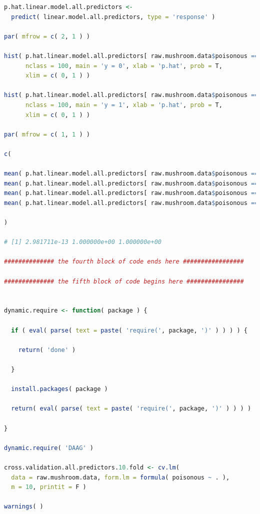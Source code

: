 \documentclass[12pt]{article}
\begin{document}
\begin{lstlisting}[language = R]
p.hat.linear.model.all.predictors <- 
  predict( linear.model.all.predictors, type = 'response' )

par( mfrow = c( 2, 1 ) )

hist( p.hat.linear.model.all.predictors[ raw.mushroom.data$poisonous == 0 ],
      nclass = 100, main = 'y = 0', xlab = 'p.hat', prob = T,
      xlim = c( 0, 1 ) )

hist( p.hat.linear.model.all.predictors[ raw.mushroom.data$poisonous == 1 ],
      nclass = 100, main = 'y = 1', xlab = 'p.hat', prob = T,
      xlim = c( 0, 1 ) )

par( mfrow = c( 1, 1 ) )

c( 
  
mean( p.hat.linear.model.all.predictors[ raw.mushroom.data$poisonous == 0 ] ),
mean( p.hat.linear.model.all.predictors[ raw.mushroom.data$poisonous == 1 ] ),
mean( p.hat.linear.model.all.predictors[ raw.mushroom.data$poisonous == 1 ] ) -
mean( p.hat.linear.model.all.predictors[ raw.mushroom.data$poisonous == 0 ] )
  
)

# [1] 2.981711e-13 1.000000e+00 1.000000e+00

############## the fourth block of code ends here #################

############## the fifth block of code begins here ################


dynamic.require <- function( package ) {
  
  if ( eval( parse( text = paste( 'require(', package, ')' ) ) ) ) {
    
    return( 'done' )
    
  }
  
  install.packages( package )
  
  return( eval( parse( text = paste( 'require(', package, ')' ) ) ) )
  
}

dynamic.require( 'DAAG' )

cross.validation.all.predictors.10.fold <- cv.lm( 
  data = raw.mushroom.data, form.lm = formula( poisonous ~ . ), 
  m = 10, printit = F ) 

warnings( )


\end{lstlisting}
\end{document}
